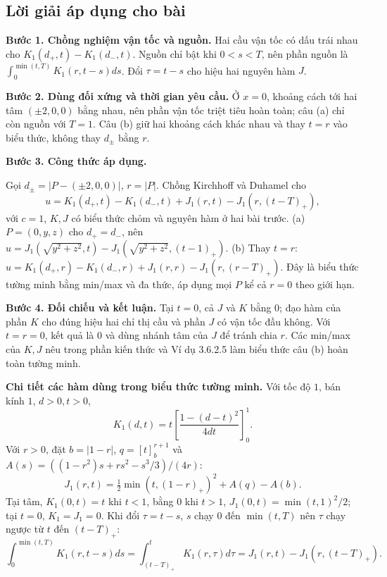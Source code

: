 \documentclass[10pt,a4paper]{article}
\begin{document}
\subsection*{Lời giải áp dụng cho bài}
\textbf{Bước 1. Chồng nghiệm vận tốc và nguồn.} Hai cầu vận tốc có dấu trái nhau cho $K_1(d_+,t)-K_1(d_-,t)$. Nguồn chỉ bật khi $0<s<T$, nên phần nguồn là $\int_0^{\min(t,T)}K_1(r,t-s)ds$. Đổi $\tau=t-s$ cho hiệu hai nguyên hàm $J$.

\textbf{Bước 2. Dùng đối xứng và thời gian yêu cầu.} Ở $x=0$, khoảng cách tới hai tâm $(\pm2,0,0)$ bằng nhau, nên phần vận tốc triệt tiêu hoàn toàn; câu (a) chỉ còn nguồn với $T=1$. Câu (b) giữ hai khoảng cách khác nhau và thay $t=r$ vào biểu thức, không thay $d_\pm$ bằng $r$.

\textbf{Bước 3. Công thức áp dụng.}

Gọi $d_\pm=|P-(\pm2,0,0)|$, $r=|P|$. Chồng Kirchhoff và Duhamel cho
\[u=K_1(d_+,t)-K_1(d_-,t)+J_1(r,t)-J_1(r,(t-T)_+),\]
với $c=1$, $K,J$ có biểu thức chỏm và nguyên hàm ở hai bài trước.
(a) $P=(0,y,z)$ cho $d_+=d_-$, nên $u=J_1(\sqrt{y^2+z^2},t)-J_1(\sqrt{y^2+z^2},(t-1)_+)$.
(b) Thay $t=r$: $u=K_1(d_+,r)-K_1(d_-,r)+J_1(r,r)-J_1(r,(r-T)_+)$. Đây là biểu thức tường minh bằng min/max và đa thức, áp dụng mọi $P$ kể cả $r=0$ theo giới hạn.

\textbf{Bước 4. Đối chiếu và kết luận.} Tại $t=0$, cả $J$ và $K$ bằng $0$; đạo hàm của phần $K$ cho đúng hiệu hai chỉ thị cầu và phần $J$ có vận tốc đầu không. Với $t=r=0$, kết quả là $0$ và dùng nhánh tâm của $J$ để tránh chia $r$. Các min/max của $K,J$ nêu trong phần kiến thức và Ví dụ 3.6.2.5 làm biểu thức câu (b) hoàn toàn tường minh.

\textbf{Chi tiết các hàm dùng trong biểu thức tường minh.} Với tốc độ $1$, bán kính $1$, $d>0,t>0$,
\[K_1(d,t)=t\left[\frac{1-(d-t)^2}{4dt}\right]_0^1.\]
Với $r>0$, đặt $b=|1-r|$, $q=[t]_b^{r+1}$ và $A(s)=((1-r^2)s+rs^2-s^3/3)/(4r)$:
\[J_1(r,t)=\tfrac12\min(t,(1-r)_+)^2+A(q)-A(b).\]
Tại tâm, $K_1(0,t)=t$ khi $t<1$, bằng $0$ khi $t>1$, $J_1(0,t)=\min(t,1)^2/2$; tại $t=0$, $K_1=J_1=0$. Khi đổi $\tau=t-s$, $s$ chạy $0$ đến $\min(t,T)$ nên $\tau$ chạy ngược từ $t$ đến $(t-T)_+$:
\[\int_0^{\min(t,T)}K_1(r,t-s)ds=\int_{(t-T)_+}^{t}K_1(r,\tau)d\tau=J_1(r,t)-J_1(r,(t-T)_+).\]
\end{document}
